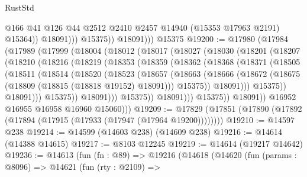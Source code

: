 \begin{lexlean}{RustStd}
\begin{coremodule}
                        @166
                        @41
                        @126
                        @44
                        @2512
                        @2410
                        @2457
                        @14940
                        (@15353 @17963 @2191)
                        @15364))
                    @18091)))
              @15375))
          @18091)))
    @15375
@19200 := @17980
    (@17984
      (@17989
        (@17999
          (@18004
            (@18012
              (@18017
                (@18027
                  (@18030
                    (@18201
                      (@18207
                        (@18210
                          (@18216
                            (@18219
                              (@18353
                                (@18359
                                  (@18362
                                    (@18368
                                      (@18371
                                        (@18505
                                          (@18511
                                            (@18514
                                              (@18520
                                                (@18523
                                                  (@18657
                                                    (@18663
                                                      (@18666
                                                        (@18672
                                                          (@18675
                                                            (@18809
                                                              (@18815 (@18818 @19152) @18091)))
                                                          @15375))
                                                      @18091)))
                                                @15375))
                                            @18091)))
                                      @15375))
                                  @18091)))
                            @15375))
                        @18091)))
                  @15375))
              @18091))
          @16952
          @16955
          @16958
          @16960
          @15060)))
@19209 := @17829 (@17851 (@17890 (@17892 (@17894 (@17915 (@17933 (@17947 (@17964 @19200))))))))
@19210 := @14597 @238
@19214 := @14599 (@14603 @238) (@14609 @238)
@19216 := @14614 (@14388 @14615)
@19217 := @8103 @12245
@19219 := @14614 (@19217 @14642)
@19236 := @14613
    (fun (fn : @89) =>
    @19216
      (@14618
        (@14620
          (fun (params : @8096) =>
          @14621
            (fun (rty : @2109) =>

\end{coremodule}
\end{lexlean}
